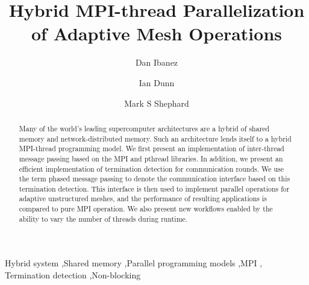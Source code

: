 \documentclass[final,1p,times]{elsarticle}
\begin{document}
\begin{frontmatter}



\title{Hybrid MPI-thread Parallelization of Adaptive Mesh Operations}


\author[a]{Dan Ibanez}
\author[a]{Ian Dunn}
\author[a]{Mark S Shephard}

\address[a]{
Scientific Computation Research Center,
Rensselaer Polytechnic Institute,
110 Eighth Street, Troy, NY 12180, USA
}

\begin{abstract}

Many of the world's leading supercomputer architectures
are a hybrid of shared memory and network-distributed memory.
Such an architecture lends itself to a hybrid MPI-thread programming
model.
We first present an implementation of inter-thread message passing
based on the MPI and pthread libraries.
In addition, we present an efficient implementation of termination
detection for communication rounds.
We use the term phased message passing to denote the communication
interface based on this termination detection.
This interface is then used to implement parallel operations
for adaptive unstructured meshes, and the performance of resulting
applications is compared to pure MPI operation.
We also present new workflows enabled by the ability to vary
the number of threads during runtime.

\end{abstract}

\begin{keyword}
Hybrid system \sep Shared memory \sep Parallel programming models \sep MPI \sep
Termination detection \sep Non-blocking


\end{keyword}

\end{frontmatter}
\end{document}
